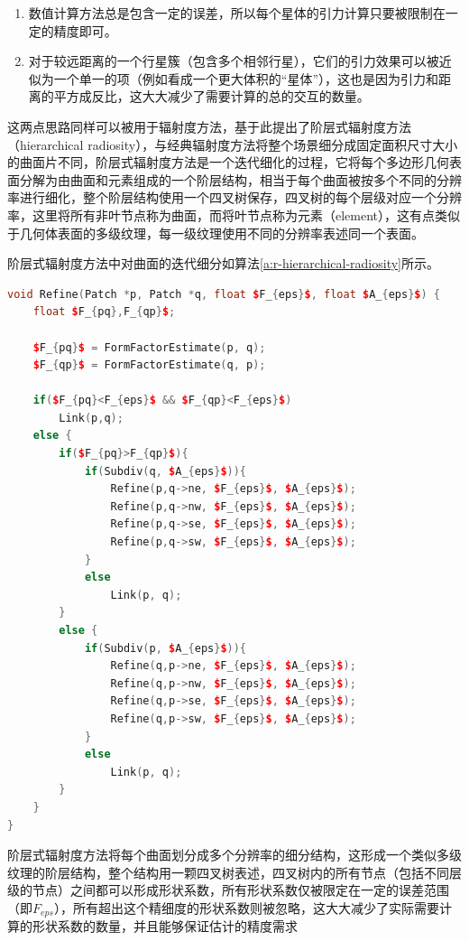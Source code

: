 \begin{enumerate}
	\item 数值计算方法总是包含一定的误差，所以每个星体的引力计算只要被限制在一定的精度即可。
	\item 对于较远距离的一个行星簇（包含多个相邻行星），它们的引力效果可以被近似为一个单一的项（例如看成一个更大体积的“星体”），这也是因为引力和距离的平方成反比，这大大减少了需要计算的总的交互的数量。
\end{enumerate}

这两点思路同样可以被用于辐射度方法，\cite{a:ARapidHierarchicalRadiosityAlgorithm}基于此提出了阶层式辐射度方法（hierarchical radiosity），与经典辐射度方法将整个场景细分成固定面积尺寸大小的曲面片不同，阶层式辐射度方法是一个迭代细化的过程，它将每个多边形几何表面分解为由曲面和元素组成的一个阶层结构，相当于每个曲面被按多个不同的分辨率进行细化，整个阶层结构使用一个四叉树保存，四叉树的每个层级对应一个分辨率，这里将所有非叶节点称为曲面，而将叶节点称为元素（element），这有点类似于几何体表面的多级纹理，每一级纹理使用不同的分辨率表述同一个表面。

阶层式辐射度方法中对曲面的迭代细分如算法\ref{a:r-hierarchical-radiosity}所示。

\begin{algorithm}
\begin{lstlisting}[language=C++, mathescape]
void Refine(Patch *p, Patch *q, float $F_{eps}$, float $A_{eps}$) {
	float $F_{pq},F_{qp}$;
	
	$F_{pq}$ = FormFactorEstimate(p, q);
	$F_{qp}$ = FormFactorEstimate(q, p);
	
	if($F_{pq}<F_{eps}$ && $F_{qp}<F_{eps}$) 
		Link(p,q);
	else {
		if($F_{pq}>F_{qp}$){
			if(Subdiv(q, $A_{eps}$)){
				Refine(p,q->ne, $F_{eps}$, $A_{eps}$);
				Refine(p,q->nw, $F_{eps}$, $A_{eps}$);
				Refine(p,q->se, $F_{eps}$, $A_{eps}$);
				Refine(p,q->sw, $F_{eps}$, $A_{eps}$);
			}
			else 
				Link(p, q);
		}
		else {
			if(Subdiv(p, $A_{eps}$)){
				Refine(q,p->ne, $F_{eps}$, $A_{eps}$);
				Refine(q,p->nw, $F_{eps}$, $A_{eps}$);
				Refine(q,p->se, $F_{eps}$, $A_{eps}$);
				Refine(q,p->sw, $F_{eps}$, $A_{eps}$);
			}
			else 
				Link(p, q);
		}
	}
}
\end{lstlisting}
\caption{阶层式辐射度方法将每个曲面划分成多个分辨率的细分结构，这形成一个类似多级纹理的阶层结构，整个结构用一颗四叉树表述，四叉树内的所有节点（包括不同层级的节点）之间都可以形成形状系数，所有形状系数仅被限定在一定的误差范围（即$F_{eps}$），所有超出这个精细度的形状系数则被忽略，这大大减少了实际需要计算的形状系数的数量，并且能够保证估计的精度需求}
\label{a:r-hierarchical-radiosity}
\end{algorithm}

